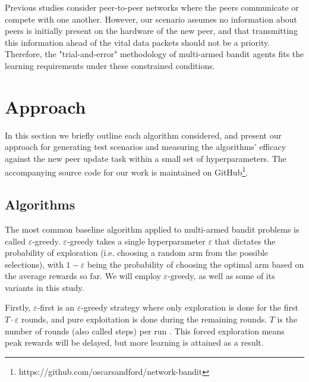 \documentclass{article}
\begin{document}
Previous studies \cite{multiuser_mab,gossip_based_distrivuted_stochastic,p2p_offloading_with_delayed_feedback} consider peer-to-peer networks where the peers communicate 
or compete with one another. However, our scenario assumes no information about peers is initially present on the hardware of the new peer, and that transmitting this 
information ahead of the vital data packets should not be a priority. Therefore, the "trial-and-error" methodology of multi-armed bandit agents fits the learning 
requirements under these constrained conditions.


\section{Approach}


In this section we briefly outline each algorithm considered, and present our approach for generating test scenarios and measuring the algorithms' efficacy against the 
new peer update task within a small set of hyperparameters. The accompanying source code for our work is maintained on 
GitHub\footnote{https://github.com/oscarsandford/network-bandit}.

\subsection{Algorithms}
The most common baseline algorithm applied to multi-armed bandit problems is called $\varepsilon$-greedy. $\varepsilon$-greedy takes a single hyperparameter $\varepsilon$ 
that dictates the probability of exploration (i.e. choosing a random arm from the possible selections), with $1-\varepsilon$ being the probability of choosing the optimal 
arm based on the average rewards so far. We will employ $\varepsilon$-greedy, as well as some of its variants in this study. 

Firstly, $\varepsilon$-first is an $\varepsilon$-greedy strategy where only exploration is done for the first $T \cdot \varepsilon$ rounds, and pure exploitation 
is done during the remaining rounds. $T$ is the number of rounds (also called steps) per run \cite{mab_algos}. This forced exploration means peak rewards will be delayed, 
but more learning is attained as a result.
\end{document}
